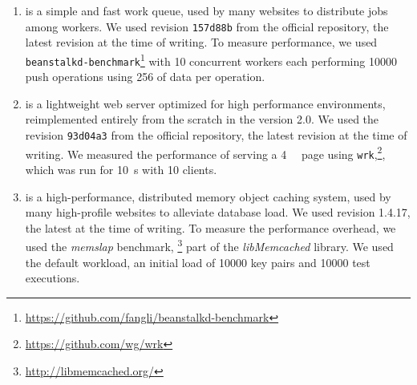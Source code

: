 \begin{enumerate}

\item[\beanstalkd\footnote{\url{http://kr.github.io/beanstalkd/}}]
is a simple and fast work queue, used by many websites to
distribute jobs among workers. We used revision \lstinline`157d88b` from the
official \git repository, the latest revision at the time of
writing.  To measure performance, we used
\lstinline`beanstalkd-benchmark`\footnote{\url{https://github.com/fangli/beanstalkd-benchmark}}
with \num{10} concurrent workers each performing \num{10000} push operations
using \SI{256}{\byte} of data per operation.


\item[\lighttpdtwo\footnote{\url{https://github.com/lighttpd/lighttpd2}}]
is a lightweight web server optimized for high performance environments,
reimplemented entirely from the scratch in the version 2.0.  We used the
revision \lstinline`93d04a3` from the official \git repository, the
latest revision at the time of writing. We measured the performance of serving
a \SI{4}{\kilo\byte} page using
\lstinline`wrk`,\footnote{\url{https://github.com/wg/wrk}}, which was run for
\SI{10}{\second} with \num{10} clients.

\item[\memcached\footnote{\url{http://memcached.org/}}]
is a high-performance, distributed memory object caching system, used by
many high-profile websites to alleviate database load. We used 
revision 1.4.17, the latest at the time of writing. To measure the performance
overhead, we used the \emph{memslap} benchmark, \footnote{\url{http://libmemcached.org/}}
part of the \emph{libMemcached} library. We used the default workload,
\ie an initial load of \num{10000} key pairs and \num{10000} test executions.



\end{enumerate}
